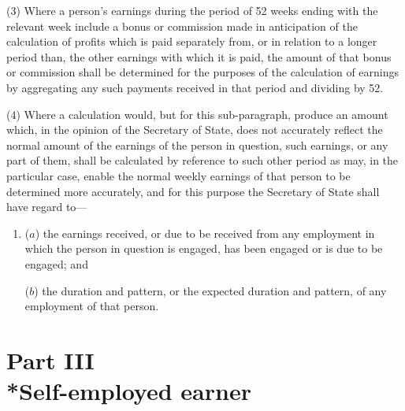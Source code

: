 \documentclass[12pt,a4paper]{article}
\begin{document}

(3) Where a person’s earnings during the period of 52 weeks ending with the relevant week include a bonus or commission made in anticipation of the calculation of profits which is paid separately from, or in relation to a longer period than, the other earnings with which it is paid, the amount of that bonus or commission shall be determined for the purposes of the calculation of earnings by aggregating any such payments received in that period and dividing by 52.

(4) Where a calculation would, but for this sub-paragraph, produce an amount which, in the opinion of the Secretary of State, does not accurately reflect the normal amount of the earnings of the person in question, such earnings, or any part of them, shall be calculated by reference to such other period as may, in the particular case, enable the normal weekly earnings of that person to be determined more accurately, and for this purpose the Secretary of State shall have regard to—
\begin{enumerate}\item[]
($a$) the earnings received, or due to be received from any employment in which the person in question is engaged, has been engaged or is due to be engaged; and

($b$) the duration and pattern, or the expected duration and pattern, of any employment of that person.
\end{enumerate}


\section[Part III --- Self-employed earner]{Part III\\*Self-employed earner}
\end{document}
